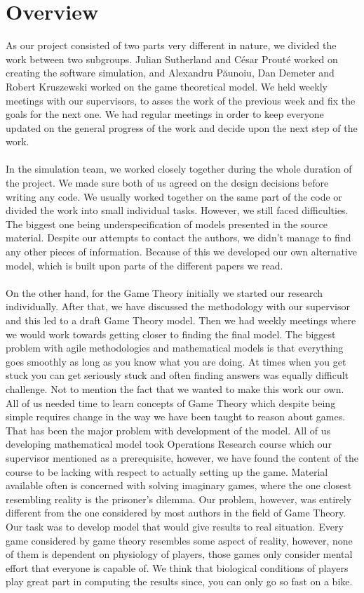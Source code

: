 \documentclass[10pt, a4paper]{report}
\begin{document}
\section{Overview}\label{sec:pmoverview}
As our project consisted of two parts very different in nature, we divided the work between two subgroups. Julian Sutherland and C\'{e}sar Prout\'{e} worked on creating the software simulation, and Alexandru P\u{a}unoiu, Dan Demeter and Robert Kruszewski worked on the game theoretical model. We held weekly meetings with our supervisors, to asses the work of the previous week and fix the goals for the next one. We had regular meetings in order to keep everyone updated on the general progress of the work and decide upon the next step of the work.
\\\\
In the simulation team, we worked closely together during the whole duration of the project. We made sure both of us agreed on the design decisions before writing any code. We usually worked together on the same part of the code or divided the work into small individual tasks. However, we still faced difficulties. The biggest one being underspecification of models presented in the source material. Despite our attempts to contact the authors, we didn't manage to find any other pieces of information. Because of this we developed our own alternative model, which is built upon parts of the different papers we read.
\\\\
On the other hand, for the Game Theory initially we started our research individually. After that, we have discussed the methodology with our supervisor and this led to a draft Game Theory model. Then we had weekly meetings where we would work towards getting closer to finding the final model. The biggest problem with agile methodologies and mathematical models is that everything goes smoothly as long as you know what you are doing. At times when you get stuck you can get seriously stuck and often finding answers was equally difficult challenge. Not to mention the fact that we wanted to make this work our own. All of us needed time to learn concepts of Game Theory which despite being simple requires change in the way we have been taught to reason about games. That has been the major problem with development of the model. All of us developing mathematical model took Operations Research course which our supervisor mentioned as a prerequisite, however, we have found the content of the course to be lacking with respect to actually setting up the game. Material available often is concerned with solving imaginary games, where the one closest resembling reality is the prisoner's dilemma. Our problem, however, was entirely different from the one considered by most authors in the field of Game Theory. Our task was to develop model that would give results to real situation. Every game considered by game theory resembles some aspect of reality, however, none of them is dependent on physiology of players, those games only consider mental effort that everyone is capable of. We think that biological conditions of players play great part in computing the results since, you can only go so fast on a bike.
\end{document}
